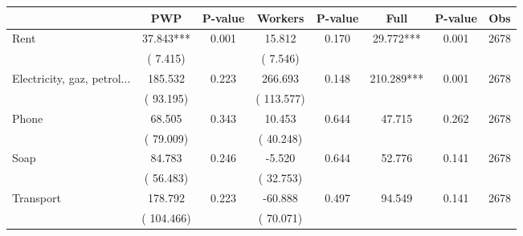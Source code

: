 
\begin{tabular}{l*{7}{c}}\hline&\multicolumn{1}{c}{PWP}&\multicolumn{1}{c}{P-value}&\multicolumn{1}{c}{Workers}&\multicolumn{1}{c}{P-value}&\multicolumn{1}{c}{Full}&\multicolumn{1}{c}{P-value}&\multicolumn{1}{c}{Obs} \\ \hline

 Rent       &             37.843***       &        0.001  &             15.812       &        0.170  &             29.772***       &              0.001 &  2678 \\ 
                       &       (       7.415)             &                               &       (       7.546)                     &                               &                                               &                                &                      \\ 

 Electricity, gaz, petrol...       &            185.532       &        0.223  &            266.693       &        0.148  &            210.289***       &              0.001 &  2678 \\ 
                       &       (      93.195)             &                               &       (     113.577)                     &                               &                                               &                                &                      \\ 

 Phone       &             68.505       &        0.343  &             10.453       &        0.644  &             47.715       &              0.262 &  2678 \\ 
                       &       (      79.009)             &                               &       (      40.248)                     &                               &                                               &                                &                      \\ 

 Soap       &             84.783       &        0.246  &             -5.520       &        0.644  &             52.776       &              0.141 &  2678 \\ 
                       &       (      56.483)             &                               &       (      32.753)                     &                               &                                               &                                &                      \\ 

 Transport       &            178.792       &        0.223  &            -60.888       &        0.497  &             94.549       &              0.141 &  2678 \\ 
                       &       (     104.466)             &                               &       (      70.071)                     &                               &                                               &                                &                      \\ 


\end{tabular}
